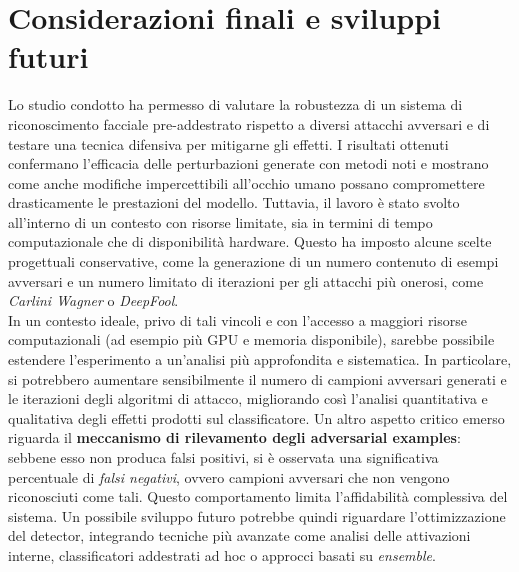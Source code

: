 \chapter{Considerazioni finali e sviluppi futuri}
    Lo studio condotto ha permesso di valutare la robustezza di un sistema di riconoscimento facciale pre-addestrato rispetto a diversi attacchi avversari e di testare una tecnica difensiva per mitigarne gli effetti. I risultati ottenuti confermano l’efficacia delle perturbazioni generate con metodi noti e mostrano come anche modifiche impercettibili all’occhio umano possano compromettere drasticamente le prestazioni del modello.
    Tuttavia, il lavoro è stato svolto all’interno di un contesto con risorse limitate, sia in termini di tempo computazionale che di disponibilità hardware. Questo ha imposto alcune scelte progettuali conservative, come la generazione di un numero contenuto di esempi avversari e un numero limitato di iterazioni per gli attacchi più onerosi, come \textit{Carlini Wagner} o \textit{DeepFool}. \\
    In un contesto ideale, privo di tali vincoli e con l’accesso a maggiori risorse computazionali (ad esempio più GPU e memoria disponibile), sarebbe possibile estendere l’esperimento a un’analisi più approfondita e sistematica.
    In particolare, si potrebbero aumentare sensibilmente il numero di campioni avversari generati e le iterazioni degli algoritmi di attacco, migliorando così l’analisi quantitativa e qualitativa degli effetti prodotti sul classificatore.
    Un altro aspetto critico emerso riguarda il \textbf{meccanismo di rilevamento degli adversarial examples}: sebbene esso non produca falsi positivi, si è osservata una significativa percentuale di \textit{falsi negativi}, ovvero campioni avversari che non vengono riconosciuti come tali. Questo comportamento limita l’affidabilità complessiva del sistema. Un possibile sviluppo futuro potrebbe quindi riguardare l’ottimizzazione del detector, integrando tecniche più avanzate come analisi delle attivazioni interne, classificatori addestrati ad hoc o approcci basati su \textit{ensemble}.